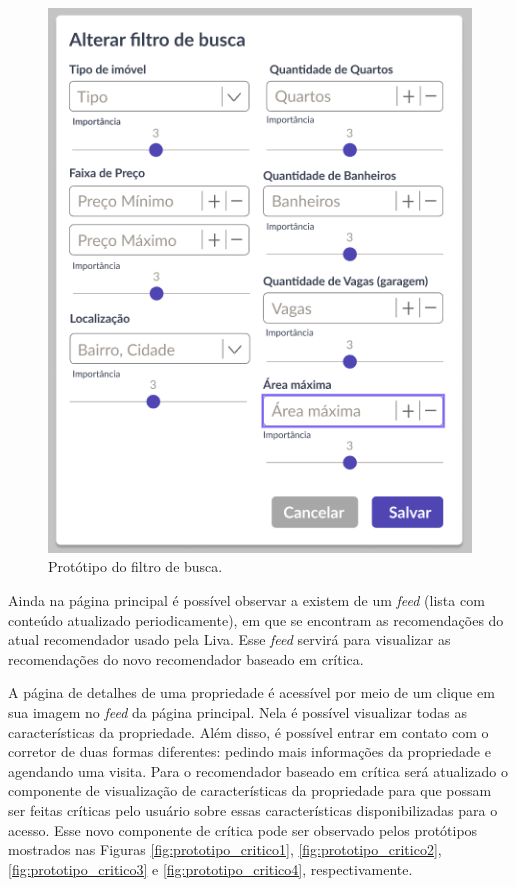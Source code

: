 \begin{figure}[H]
    \centering
    \includegraphics[scale=0.6]{figuras/proposta/prototipo_search_profile.png}
    \caption[Protótipo do filtro de busca]{Protótipo do filtro de busca.}
    \label{fig:prototipo_search_profile}
\end{figure}

Ainda na página principal é possível observar a existem de um \textit{feed} (lista com conteúdo atualizado periodicamente), em que se encontram as recomendações do atual recomendador usado pela Liva. Esse \textit{feed} servirá para visualizar as recomendações do novo recomendador baseado em crítica.

A página de detalhes de uma propriedade é acessível por meio de um clique em sua imagem no \textit{feed} da página principal. Nela é possível visualizar todas as características da propriedade. Além disso, é possível entrar em contato com o corretor de duas formas diferentes: pedindo mais informações da propriedade e agendando uma visita. Para o recomendador baseado em crítica será atualizado o componente de visualização de características da propriedade para que possam ser feitas críticas pelo usuário sobre essas características disponibilizadas para o acesso. Esse novo componente de crítica pode ser observado pelos protótipos mostrados nas Figuras \ref{fig:prototipo_critico1}, \ref{fig:prototipo_critico2}, \ref{fig:prototipo_critico3} e \ref{fig:prototipo_critico4}, respectivamente.

